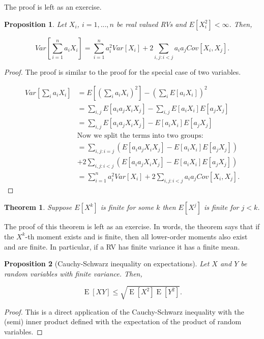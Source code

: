 \documentclass{book}
\theoremstyle{plain}%
\newtheorem{theorem}{Theorem}[section]
\newtheorem{proposition}{Proposition}[section]
\theoremstyle{definition}
\DeclareMathOperator{\E}{E}
\begin{document}
The proof is left as an exercise.

\begin{proposition}
Let $X_i$, $i = 1,...,n$ be real valued RVs and $E[X_i^2] < \infty$. Then,

$$Var[\sum_{i=1}^n a_iX_i] = \sum_{i=1}^n a_i^2Var[X_i]+ 2\sum_{i,j:i<j}a_ia_jCov[X_i,X_j].$$
\end{proposition}

\begin{proof}
The proof is similar to the proof for the special case of two variables.

\begin{align*}
Var[\sum_{i} a_iX_i] &= E[(\sum_{i}a_iX_i)^2] - (\sum_i E[a_iX_i])^2  \\
&= \sum_{i,j} E[a_ia_jX_iX_j] - \sum_{i,j} E[a_iX_i]E[a_jX_j]\\
&= \sum_{i,j} E[a_ia_jX_iX_j] - E[a_iX_i]E[a_jX_j]\\
&\text{Now we split the terms into two groups:} \\
&= \sum_{i,j: i = j} (E[a_ia_jX_iX_j] - E[a_iX_i]E[a_jX_j]) \\ &+ 2 \sum_{i,j: i < j} (E[a_ia_jX_iX_j] - E[a_iX_i]E[a_jX_j])\\
&= \sum_{i=1}^n a_i^2Var[X_i]+ 2\sum_{i,j:i<j}a_ia_jCov[X_i,X_j].
\end{align*}
\end{proof}

\begin{theorem} Suppose $E[X^k]$ is finite for some $k$ then $E[X^j]$ is finite for $j < k$.\label{thm:moments}
\end{theorem}

The proof of this theorem is left as an exercise. In words, the theorem says that if the $X^k$-th moment exists and is finite, then all lower-order moments also exist and are finite. In particular, if a RV has finite variance it has a finite mean.

\begin{proposition}[Cauchy-Schwarz inequality on expectations]
Let $X$ and $Y$ be random variables with finite variance. Then,

$$\E[XY] \leq \sqrt{\E[X^2]\E[Y^2]}.$$
\end{proposition}

\begin{proof}
This is a direct application of the Cauchy-Schwarz inequality with the (semi) inner product defined with the expectation of the product of random variables.
\end{proof}
\end{document}
